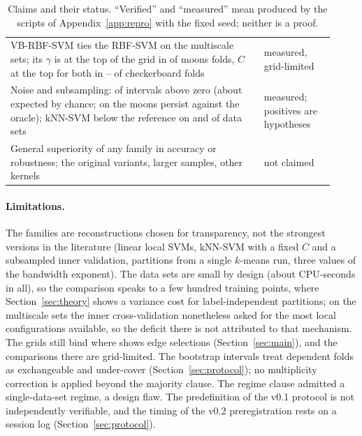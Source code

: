 \documentclass[11pt,a4paper]{article}
\theoremstyle{plain}
\theoremstyle{definition}
\theoremstyle{remark}
\begin{document}
\begin{table}[tb]
\begin{tabular}{p{0.72\linewidth}>{\raggedright\arraybackslash}p{0.20\linewidth}}
VB-RBF-SVM ties the RBF-SVM on the multiscale sets; its $\gamma$ is at the top of the grid in \EdgeMainMoonsVbGammaHi{} of \EdgeMainFoldsPerSet{} moons folds, $C$ at the top for both in \EdgeMainCheckVbCHi{}--\EdgeMainCheckRbfCHi{} of \EdgeMainFoldsPerSet{} checkerboard folds & measured, grid-limited\\
Noise and subsampling: \NPosRobustCells{} of \NRobustCells{} intervals above zero (about \ExpectedPosRobust{} expected by chance; \NPosRobustPersist{} on the moons persist against the oracle); kNN-SVM below the reference on \NNegNoiseKnn{} and \NNegSubKnn{} of \NDatasets{} data sets & measured; positives are hypotheses\\
General superiority of any family in accuracy or robustness; the original variants, larger samples, other kernels & not claimed\\
\bottomrule
\end{tabular}
\caption{Claims and their status. ``Verified'' and ``measured'' mean produced by the scripts of Appendix~\ref{app:repro} with the fixed seed; neither is a proof.}
\label{tab:claims}
\end{table}

\paragraph{Limitations.} The families are reconstructions chosen for transparency, not the strongest versions in the literature (linear local SVMs, kNN-SVM with a fixed $C$ and a subsampled inner validation, partitions from a single $k$-means run, three values of the bandwidth exponent). The data sets are small by design (about \MetaSecondsTotal{} CPU-seconds in all), so the comparison speaks to a few hundred training points, where Section~\ref{sec:theory} shows a variance cost for label-independent partitions; on the multiscale sets the inner cross-validation nonetheless asked for the most local configurations available, so the deficit there is not attributed to that mechanism. The grids still bind where  shows edge selections (Section~\ref{sec:main}), and the comparisons there are grid-limited. The bootstrap intervals treat dependent folds as exchangeable and under-cover (Section~\ref{sec:protocol}); no multiplicity correction is applied beyond the majority clause. The regime clause admitted a single-data-set regime, a design flaw. The predefinition of the v0.1 protocol is not independently verifiable, and the timing of the v0.2 preregistration rests on a session log (Section~\ref{sec:protocol}).
\end{document}
